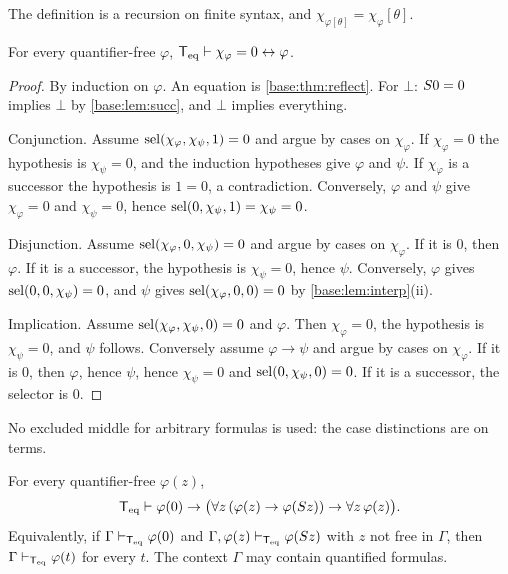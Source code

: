 The definition is a recursion on finite syntax, and
$\chi_{\varphi[\theta]}=\chi_\varphi[\theta]$.

\begin{proposition}
\label{base:prop:chi}
For every quantifier-free $\varphi$,
$\mathsf{T}_{\mathrm{eq}}\vdash\chi_\varphi=0\leftrightarrow\varphi$.
\end{proposition}

\begin{proof}
By induction on $\varphi$.  An equation is \cref{base:thm:reflect}.  For
$\bot$: $S 0=0$ implies $\bot$ by \cref{base:lem:succ}, and $\bot$
implies everything.

Conjunction.  Assume $\operatorname{sel}(\chi_\varphi,\chi_\psi,1)=0$ and argue by cases on
$\chi_\varphi$.  If $\chi_\varphi=0$ the hypothesis is $\chi_\psi=0$, and
the induction hypotheses give $\varphi$ and $\psi$.  If $\chi_\varphi$ is a
successor the hypothesis is $1=0$, a contradiction.  Conversely, $\varphi$
and $\psi$ give $\chi_\varphi=0$ and $\chi_\psi=0$, hence
$\operatorname{sel}(0,\chi_\psi,1)=\chi_\psi=0$.

Disjunction.  Assume $\operatorname{sel}(\chi_\varphi,0,\chi_\psi)=0$ and argue by cases
on $\chi_\varphi$.  If it is $0$, then $\varphi$.  If it is a successor, the
hypothesis is $\chi_\psi=0$, hence $\psi$.  Conversely, $\varphi$ gives
$\operatorname{sel}(0,0,\chi_\psi)=0$, and $\psi$ gives $\operatorname{sel}(\chi_\varphi,0,0)=0$ by
\cref{base:lem:interp}(ii).

Implication.  Assume $\operatorname{sel}(\chi_\varphi,\chi_\psi,0)=0$ and $\varphi$.  Then
$\chi_\varphi=0$, the hypothesis is $\chi_\psi=0$, and $\psi$ follows.
Conversely assume $\varphi\to\psi$ and argue by cases on $\chi_\varphi$.  If
it is $0$, then $\varphi$, hence $\psi$, hence $\chi_\psi=0$ and
$\operatorname{sel}(0,\chi_\psi,0)=0$.  If it is a successor, the selector is $0$.
\end{proof}

No excluded middle for arbitrary formulas is used: the case distinctions are
on terms.

\begin{theorem}
\label{base:thm:qfi}
For every quantifier-free $\varphi(z)$,
\[
 \mathsf{T}_{\mathrm{eq}}\vdash\varphi(0)\to\bigl(\forall z\,(\varphi(z)\to\varphi(S z))
 \to\forall z\,\varphi(z)\bigr).
\]
Equivalently, if $\Gamma\vdash_{\mathsf{T}_{\mathrm{eq}}}\varphi(0)$ and
$\Gamma,\varphi(z)\vdash_{\mathsf{T}_{\mathrm{eq}}}\varphi(S z)$ with $z$ not free in
$\Gamma$, then $\Gamma\vdash_{\mathsf{T}_{\mathrm{eq}}}\varphi(t)$ for every $t$.  The context
$\Gamma$ may contain quantified formulas.
\end{theorem}

